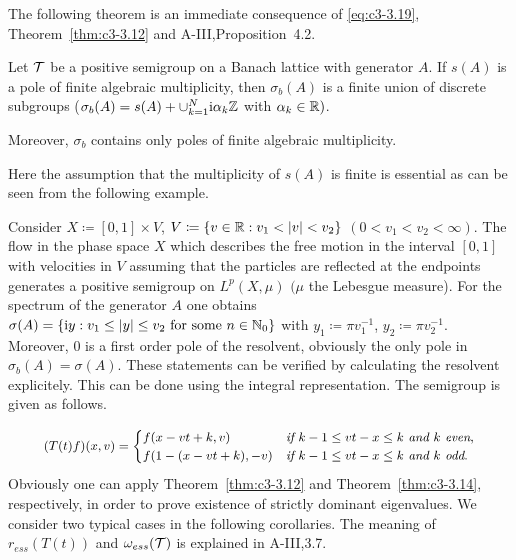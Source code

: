The following theorem is an immediate consequence of \eqref{eq:c3-3.19}, Theorem~\ref{thm:c3-3.12} and A-III,Proposition~4.2.

\begin{theorem}\label{thm:c3-3.14}
	Let $\mathcal{T}$ be a positive semigroup on a Banach lattice with generator $A$. 
	If $s(A)$ is a pole of finite algebraic multiplicity, then $\sigma_{b}(A)$ is a finite union of discrete subgroups (\ie  $\sigma_{b}(A) = s(A) + \cup_{k=1}^{N}\mathrm{i}\alpha_{k}\mathbb{Z}$ with $\alpha_{k} \in \mathbb{R} )$.
	
	Moreover, $\sigma_{b}$ contains only poles of finite algebraic multiplicity.
\end{theorem}

Here the assumption that the multiplicity of $s(A)$ is finite is essential as can be seen from the following example.

\begin{example}\label{ex:c3-3.15}
	Consider $X \coloneqq  [0,1] \times V$, $V \coloneqq  \{v \in \mathbb{R}  : v_{1} < |v| < v_{2}\}$ $(0 < v_{1} < v_{2} < \infty)$. 
	The flow in the phase space $X$ which describes the free motion in the interval $[0,1]$ with velocities in $V$ assuming that the particles are reflected at the endpoints generates a positive semigroup on $L^{p}(X,\mu)$ $(\mu$ the Lebesgue measure). 
	For the spectrum of the generator $A$ one obtains $\sigma(A) = \{\mathrm{i} y : v_{1} \leq |y| \leq v_{2} \text{ for some } n \in \mathbb{N}_{0}\}$ with $y_{1} \coloneqq  \pi v_{1}^{-1}$, $y_{2} \coloneqq  \pi v_{2}^{-1}$. 
	Moreover, $0$ is a first order pole of the resolvent, obviously the only pole in $\sigma_{b}(A) = \sigma(A)$.
	These statements can be verified by calculating the resolvent explicitely. 
	This can be done using the integral representation. 
%
The semigroup is given as follows.

\begin{equation}\label{eq:c3-3.20}
	\textit{\small $
	(T(t)f)(x,v) = \begin{cases}
		f(x-vt+k,v) & \text{if } k-1\leq vt-x\leq k \text{ and } k \textit{ even}, \\
		f(1-(x-vt+k),-v) & \text{if } k-1\leq vt-x\leq k \text{ and } k \text{ odd}.
	\end{cases}
$}
\end{equation} 
Obviously one can apply Theorem~\ref{thm:c3-3.12} and Theorem~\ref{thm:c3-3.14}, respectively, in order to prove existence of strictly dominant eigenvalues. 
We consider two typical cases in the following corollaries. 
The meaning of $r_{ess}(T(t))$ and $\omega_{ess}(\mathcal{T})$ is explained in A-III,3.7.
\end{example}

